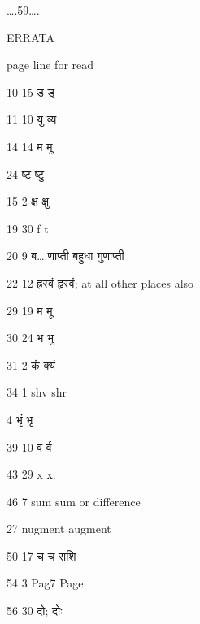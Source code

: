 \documentclass[]{article}
\date{}
\begin{document}
{\ldots{}.59\ldots{}.}

{ERRATA}

{page line for read }

{10 15 ड ड्}

{11 10 यु व्य}

{14 14 म मू}

{ 24 ष्ट ष्टु}

{15 2 क्ष क्षु}

{19 30 f t}

{20 9 ब\ldots{}.णाप्ती बहुधा गुणाप्ती }

{22 12 ह्रस्वं हृस्वं; at all other places also }

{29 19 म मू}

{30 24 भ भु }

{31 2 कं क्यं}

{34 1 shv shr}

{ 4 भृं भृ}

{39 10 व र्व}

{43 29 x x.}

{46 7 sum sum or difference}

{ 27 nugment augment}

{50 17 च च राशि}

{54 3 Pag7 Page}

{56 30 दो; दोः}
\end{document}
